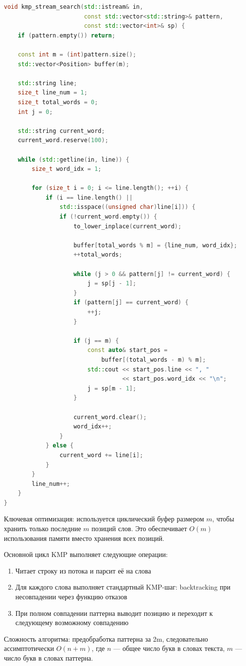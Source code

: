 \begin{lstlisting}[language=C++]
void kmp_stream_search(std::istream& in, 
                       const std::vector<std::string>& pattern, 
                       const std::vector<int>& sp) {
    if (pattern.empty()) return;

    const int m = (int)pattern.size();
    std::vector<Position> buffer(m);
    
    std::string line;
    size_t line_num = 1;
    size_t total_words = 0;
    int j = 0;
    
    std::string current_word;
    current_word.reserve(100); 

    while (std::getline(in, line)) {
        size_t word_idx = 1;
        
        for (size_t i = 0; i <= line.length(); ++i) {
            if (i == line.length() || 
                std::isspace((unsigned char)line[i])) {
                if (!current_word.empty()) {
                    to_lower_inplace(current_word);

                    buffer[total_words % m] = {line_num, word_idx};
                    ++total_words;

                    while (j > 0 && pattern[j] != current_word) {
                        j = sp[j - 1];
                    }
                    if (pattern[j] == current_word) {
                        ++j;
                    }

                    if (j == m) {
                        const auto& start_pos = 
                            buffer[(total_words - m) % m];
                        std::cout << start_pos.line << ", " 
                                  << start_pos.word_idx << "\n";
                        j = sp[m - 1];
                    }

                    current_word.clear();
                    word_idx++;
                }
            } else {
                current_word += line[i];
            }
        }
        line_num++;
    }
}
\end{lstlisting}

Ключевая оптимизация: используется циклический буфер размером $m$, чтобы хранить только последние $m$ позиций слов. Это обеспечивает $O(m)$ использования памяти вместо хранения всех позиций.

Основной цикл KMP выполняет следующие операции:
\begin{enumerate}
    \item Читает строку из потока и парсит её на слова
    \item Для каждого слова выполняет стандартный KMP-шаг: backtracking при несовпадении через функцию отказов
    \item При полном совпадении паттерна выводит позицию и переходит к следующему возможному совпадению
\end{enumerate}

Сложность алгоритма: предобработка паттерна за 2m, следовательно ассимптотически $O(n + m)$, где $n$ — общее число букв в словах текста, $m$ — число букв в словах паттерна.

\pagebreak
